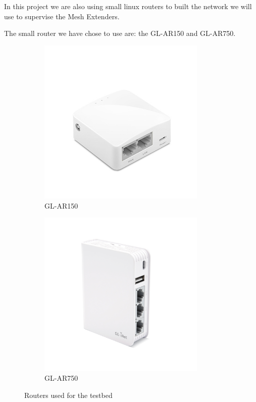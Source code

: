 In this project we are also using small linux routers to built the network we will use to supervise the Mesh Extenders.

The small router we have chose to use are: the GL-AR150 and GL-AR750.

\begin{figure}[H]
\centering
\begin{subfigure}{.5\textwidth}
  \centering
	\includegraphics[width=8cm]{image/AR150.jpg}%
	\caption{GL-AR150}%
	\label{figure:AR150}%
\end{subfigure}%
\begin{subfigure}{.5\textwidth}
  \centering
  \includegraphics[width=8cm]{image/AR750.jpg}%
	\caption{GL-AR750}%
	\label{figure:AR750}%
\end{subfigure}
\caption{Routers used for the testbed}
\label{fig:routers}
\end{figure}


